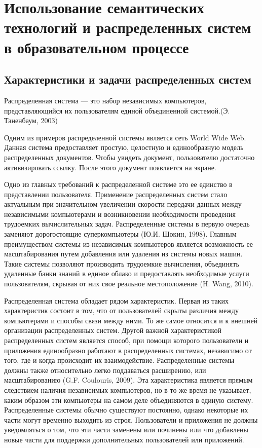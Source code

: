 \chapter{Использование семантических технологий и распределенных систем в образовательном процессе} \label{chapt1}




\section{Характеристики и задачи распределенных систем} \label{sect1_1}

Распределенная система — это набор независимых компьютеров, представляющийся их пользователям единой объединенной системой.(Э. Таненбаум, 2003)

Одним из примеров  распределенной системы является сеть World Wide Web. Данная система предоставляет простую, целостную и единообразную модель распределенных документов. Чтобы увидеть документ, пользователю достаточно активизировать ссылку. После этого документ появляется на экране. 

Одно из главных требований к распределенной системе это ее единство в представлении пользователя. Применение распределенных систем стало актуальным при значительном увеличении скорости передачи данных между независимыми компьютерами и возникновении необходимости проведения трудоемких вычислительных задач. Распределенные системы в первую очередь заменяют дорогостоящие суперкомпьютеры (Ю.И. Шокин, 1998). Главным преимуществом системы из независимых компьютеров является возможность ее масштабирования путем добавления или удаления из системы новых машин. Такие системы позволяют производить трудоемкие вычисления, объединять удаленные банки знаний в единое облако и предоставлять необходимые услуги пользователям, скрывая от них свое реальное местоположение (H. Wang, 2010).

Распределенная система обладает рядом характеристик. Первая из таких характеристик состоит в том, что от пользователей скрыты различия между компьютерами и способы связи между ними. То же самое относится и к внешней организации распределенных систем. Другой важной характеристикой распределенных систем является способ, при помощи которого пользователи и приложения единообразно работают в распределенных системах, независимо от того, где и когда происходит их взаимодействие. Распределенные системы должны также относительно легко поддаваться расширению, или масштабированию (G.F. Coulouris, 2009).  Эта характеристика является прямым следствием наличия независимых компьютеров, но в то же время не указывает, каким образом эти компьютеры на самом деле объединяются в единую систему. Распределенные системы обычно существуют постоянно, однако некоторые их части могут временно выходить из строя. Пользователи и приложения не должны уведомляться о том, что эти части заменены или починены или что добавлены новые части для поддержки дополнительных пользователей или приложений.

